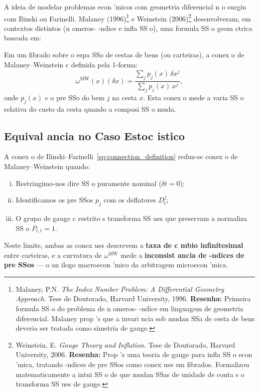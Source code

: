 {A ideia de modelar problemas econ 'micos com geometria diferencial n o
surgiu com Ilinski ou Farinelli. Malaney (1996)\footnote{Malaney, P.N.
\textit{The Index Number Problem: A Differential Geometry Approach}.
Tese de Doutorado, Harvard University, 1996. \textbf{Resenha:} Primeira
formula SS o do problema de n omeros- -ndice em linguagem de geometria
diferencial. Malaney prop 's que a invari ncia sob mudan SSa de cesta de
bens deveria ser tratada como simetria de gauge.} e Weinstein
(2006)\footnote{Weinstein, E. \textit{Gauge Theory and Inflation}.
Tese de Doutorado, Harvard University, 2006. \textbf{Resenha:} Prop 's
uma teoria de gauge para infla SS o econ 'mica, tratando -ndices de pre SSos
como conex ues em fibrados. Formalizou matematicamente a intui SS o de
que mudan SSas de unidade de conta s o transforma SS ues de gauge.}
desenvolveram, em contextos distintos (n omeros- -ndice e infla SS o), uma
formula SS o geom ctrica baseada em:

\begin{defi}\label{def:MW_connection}
Em um fibrado sobre o espa SSo de cestas de bens (ou carteiras), a
conex o de Malaney--Weinstein c definida pela 1-forma:
\begin{equation}\label{eq:MW_connection}
 \omega^{\text{MW}}(x)(\delta x)
 = \frac{\sum_{j} p_j(x)\,\delta x^j}{\sum_{j} p_j(x)\,x^j},
\end{equation}
onde $p_j(x)$ c o pre SSo do bem $j$ na cesta $x$. Esta conex o mede a
varia SS o relativa do custo da cesta quando a composi SS o muda.
\end{defi}

\subsection{Equival ancia no Caso Estoc istico}

\begin{prop}
\label{prop:MW_equivalence}
A conex o de Ilinski--Farinelli~\eqref{eq:connection_definition}
reduz-se conex o de Malaney--Weinstein quando:
\begin{enumerate}[(i)]
 \item Restringimo-nos dire SS o puramente nominal ($\delta t = 0$);
 \item Identificamos os pre SSos $p_j$ com os deflatores $D_t^j$;
 \item O grupo de gauge c restrito s transforma SS ues que preservam a
 normaliza SS o $P_{t,t} = 1$.
\end{enumerate}
Neste limite, ambas as conex ues descrevem a \textbf{taxa de c mbio
infinitesimal} entre carteiras, e a curvatura de $\omega^{\text{MW}}$
mede a \textbf{inconsist ancia de -ndices de pre SSos} --- o an ilogo
macroecon 'mico da arbitragem microecon 'mica.
\end{prop}

}
